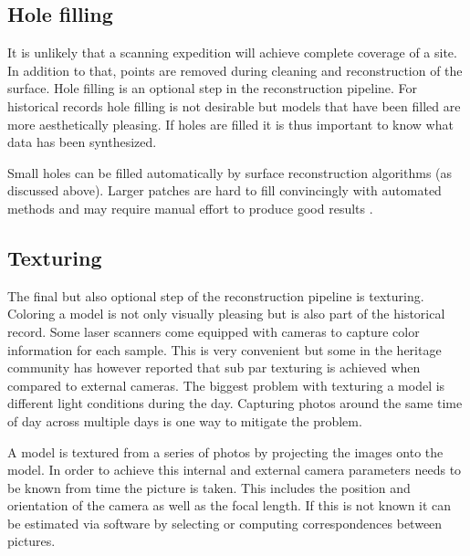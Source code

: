 \subsection{Hole filling} \label{sec:filling}

It is unlikely that a scanning expedition will achieve complete coverage of a site. In addition to that, points are removed during cleaning and reconstruction of the surface. Hole filling is an optional step in the reconstruction pipeline. For historical records hole filling is not desirable but models that have been filled are more aesthetically pleasing. If holes are filled it is thus important to know what data has been synthesized.

Small holes can be filled automatically by surface reconstruction algorithms (as discussed above). Larger patches are hard to fill convincingly with automated methods and may require manual effort to produce good results \cite{Ruther2011}. 


\subsection{Texturing} \label{sec:texturing}

The final but also optional step of the reconstruction pipeline is texturing. Coloring a model is not only visually pleasing but is also part of the historical record. Some laser scanners come equipped with cameras to capture color information for each sample. This is very convenient but some in the heritage community has however reported that sub par texturing is achieved when compared to external cameras. The biggest problem with texturing a model is different light conditions during the day. Capturing photos around the same time of day across multiple days is one way to mitigate the problem.

A model is textured from a series of photos by projecting the images onto the model. In order to achieve this internal and external camera parameters needs to be known from time the picture is taken. This includes the position and orientation of the camera as well as the focal length. If this is not known it can be estimated via software by selecting or computing correspondences between pictures.




